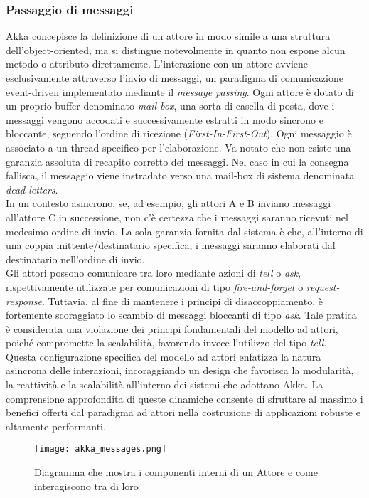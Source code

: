 \subsubsection[Passaggio di messaggi]{Passaggio di messaggi}
Akka concepisce la definizione di un attore in modo simile a una struttura dell'object-oriented, ma si distingue notevolmente in quanto non espone alcun metodo o attributo direttamente.
L'interazione con un attore avviene esclusivamente attraverso l'invio di messaggi, un paradigma di comunicazione event-driven implementato mediante il \textit{message passing}.
Ogni attore è dotato di un proprio buffer denominato \textit{mail-box}, una sorta di casella di posta, dove i messaggi vengono accodati e successivamente estratti in modo sincrono e bloccante, seguendo l'ordine di ricezione (\textit{First-In-First-Out}).
Ogni messaggio è associato a un thread specifico per l'elaborazione.
Va notato che non esiste una garanzia assoluta di recapito corretto dei messaggi.
Nel caso in cui la consegna fallisca, il messaggio viene instradato verso una mail-box di sistema denominata \textit{dead letters}. \\
In un contesto asincrono, se, ad esempio, gli attori A e B inviano messaggi all'attore C in successione, non c'è certezza che i messaggi saranno ricevuti nel medesimo ordine di invio.
La sola garanzia fornita dal sistema è che, all'interno di una coppia mittente/destinatario specifica, i messaggi saranno elaborati dal destinatario nell'ordine di invio. \\
Gli attori possono comunicare tra loro mediante azioni di \textit{tell} o \textit{ask}, rispettivamente utilizzate per comunicazioni di tipo \textit{fire-and-forget} o \textit{request-response}.
Tuttavia, al fine di mantenere i principi di disaccoppiamento, è fortemente scoraggiato lo scambio di messaggi bloccanti di tipo \textit{ask}.
Tale pratica è considerata una violazione dei principi fondamentali del modello ad attori, poiché compromette la scalabilità, favorendo invece l'utilizzo del tipo \textit{tell}. \\
Questa configurazione specifica del modello ad attori enfatizza la natura asincrona delle interazioni, incoraggiando un design che favorisca la modularità, la reattività e la scalabilità all'interno dei sistemi che adottano Akka.
La comprensione approfondita di queste dinamiche consente di sfruttare al massimo i benefici offerti dal paradigma ad attori nella costruzione di applicazioni robuste e altamente performanti. 

\begin{figure}[!ht]
  \centering
  \texttt{[image: akka\_messages.png]}
  \caption[Componenti AKKA]{Diagramma che mostra i componenti interni di un Attore e come interagiscono tra di loro}
\end{figure}


